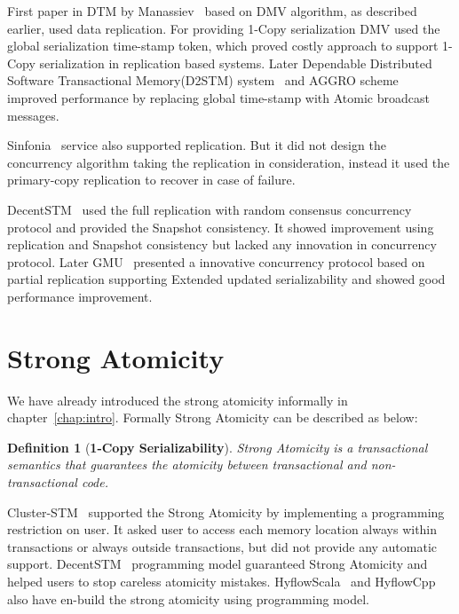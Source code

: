 \documentclass[12pt,english]{report}
\newtheorem{definition}{Definition}[section]
\begin{document}
First paper in DTM by Manassiev~\cite{Manassiev:2006:EDV:1122971.1123002} based on DMV algorithm, as described earlier, used data replication. For providing 1-Copy serialization DMV used the global serialization time-stamp token, which proved costly approach to support 1-Copy serialization in replication based systems. Later Dependable Distributed Software Transactional Memory(D2STM) system~\cite{D2STM:5368778} and AGGRO scheme~\cite{AGGRO:5598236} improved performance by replacing global time-stamp with Atomic broadcast messages.  

Sinfonia~\cite{Aguilera:2009:SNP:1629087.1629088} service also supported replication. But it did not design the concurrency algorithm taking the replication in consideration, instead it used the primary-copy replication to recover in case of failure. 

DecentSTM~\cite{DecentSTM:5470446} used the full replication with random consensus concurrency protocol and provided the  Snapshot consistency. It showed improvement using replication and Snapshot consistency but lacked any innovation in concurrency protocol. Later GMU~\cite{GMU:peluso2012scalability} presented a innovative concurrency protocol based on partial replication supporting Extended updated serializability and showed good performance improvement. 

\section{Strong Atomicity}
We have already introduced the strong atomicity informally in chapter~\ref{chap:intro}. Formally Strong Atomicity can be described as below:

\begin{definition}[\textbf{1-Copy Serializability}] 
Strong Atomicity is a transactional semantics that guarantees the atomicity between transactional and non-transactional code.
\end{definition}

Cluster-STM~\cite{Bocchino:2008:STM:1345206.1345242} supported the Strong Atomicity by implementing a programming restriction on user. It asked user to access each memory location always within transactions or always outside transactions, but did not provide any automatic support. DecentSTM~\cite{DecentSTM:5470446} programming model guaranteed Strong Atomicity and helped users to stop careless atomicity mistakes. HyflowScala~\cite{turcuhyflow2} and HyflowCpp also have en-build the strong atomicity using programming model.
\end{document}

